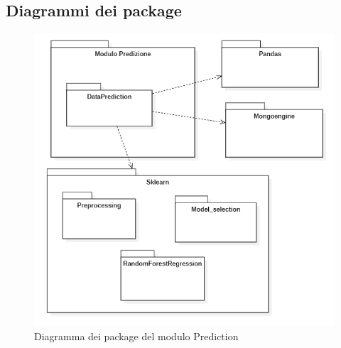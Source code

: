 \subsection{Diagrammi dei package}\label{DiagrammaDeiPackagePrediction}
\begin{center}
	\begin{figure}[H]
		\centering\includegraphics[scale=0.8]{../immagini/diag_PB/diag_pack_pred.png}
		\caption{Diagramma dei package del modulo Prediction}
	\end{figure}
\end{center}

